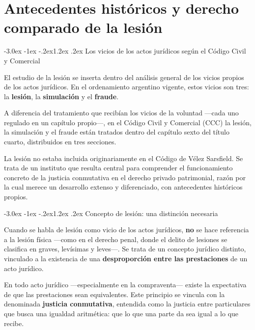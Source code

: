 \documentclass[12pt,oneside]{book}
\makeatletter
\renewcommand\section{\@startsection{section}{1}{\z@}%
  {-3.0ex \@plus -1ex \@minus -.2ex}{1.2ex \@plus .2ex}%
  {\normalfont\large\bfseries\color{acento}}}
\makeatother
\begin{document}
\chapter{Antecedentes históricos y derecho comparado de la lesión}

\section{Los vicios de los actos jurídicos según el Código Civil y Comercial}

El estudio de la lesión se inserta dentro del análisis general de los vicios propios de los actos jurídicos. En el ordenamiento argentino vigente, estos vicios son tres: la \textbf{lesión}, la \textbf{simulación} y el \textbf{fraude}.

A diferencia del tratamiento que recibían los vicios de la voluntad ---cada uno regulado en un capítulo propio---, en el Código Civil y Comercial (CCC) la lesión, la simulación y el fraude están tratados dentro del capítulo sexto del título cuarto, distribuidos en tres secciones.

\begin{nota}
La lesión no estaba incluida originariamente en el Código de Vélez Sarsfield. Se trata de un instituto que resulta central para comprender el funcionamiento concreto de la justicia conmutativa en el derecho privado patrimonial, razón por la cual merece un desarrollo extenso y diferenciado, con antecedentes históricos propios.
\end{nota}

\section{Concepto de lesión: una distinción necesaria}

\begin{definicion}
Cuando se habla de lesión como vicio de los actos jurídicos, \textbf{no} se hace referencia a la lesión física ---como en el derecho penal, donde el delito de lesiones se clasifica en graves, levísimas y leves---. Se trata de un concepto jurídico distinto, vinculado a la existencia de una \textbf{desproporción entre las prestaciones} de un acto jurídico.
\end{definicion}

En todo acto jurídico ---especialmente en la compraventa--- existe la expectativa de que las prestaciones sean equivalentes. Este principio se vincula con la denominada \textbf{justicia conmutativa}, entendida como la justicia entre particulares que busca una igualdad aritmética: que lo que una parte da sea igual a lo que recibe.
\end{document}
